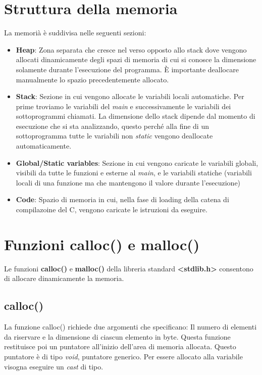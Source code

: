 \documentclass[a4paper,11pt,oneside]{book}
\begin{document}
\section{Struttura della memoria}
La memorià è suddivisa nelle seguenti sezioni:
\begin{itemize}
    \item \textbf{Heap}: Zona separata che cresce nel verso opposto allo stack dove vengono allocati dinamicamente degli spazi di memoria di cui si conosce la dimensione
    solamente durante l'esecuzione del programma. È importante deallocare manualmente lo spazio precedentemente allocato.
    \item \textbf{Stack}: Sezione in cui vengono allocate le variabili locali automatiche. Per prime troviamo le variabili del \emph{main} e successivamente le variabili dei sottoprogrammi 
    chiamati. La dimensione dello stack dipende dal momento di esecuzione che si sta analizzando, questo perché alla fine di un sottoprogramma tutte le variabili non \emph{static} vengono deallocate automaticamente.
    \item \textbf{Global/Static variables}: Sezione in cui vengono caricate le variabili globali, visibili da tutte le funzioni e esterne al \emph{main}, e le variabili
     statiche (variabili locali di una funzione ma che mantengono il valore durante l'esecuzione)
    \item \textbf{Code}: Spazio di memoria in cui, nella fase di loading della catena di compilazoine del C, vengono caricate le istruzioni da eseguire.
\end{itemize}

\section{Funzioni calloc() e malloc()}
Le funzioni \textbf{calloc()} e \textbf{malloc()} della libreria standard \textbf{<stdlib.h>} consentono di allocare dinamicamente la memoria.

\subsection{calloc()}
La funzione calloc() richiede due argomenti che specificano: Il numero di elementi da riservare e la dimensione di ciascun elemento in byte.
Questa funzione restituisce poi un puntatore all'inizio dell'area di memoria allocata. Questo puntatore è di tipo \emph{void}, puntatore generico. Per essere
allocato alla variabile visogna eseguire un \emph{cast} di tipo.
\end{document}
